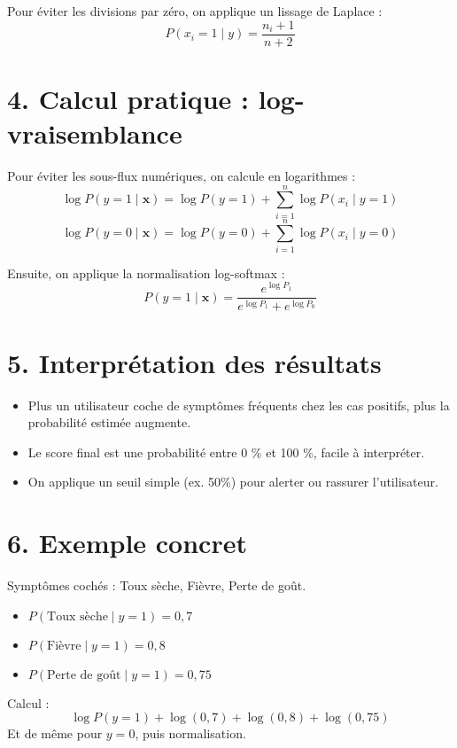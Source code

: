 \documentclass[12pt]{article}
\begin{document}
Pour éviter les divisions par zéro, on applique un lissage de Laplace :
\[
P(x_i = 1 \mid y) = \frac{n_i + 1}{n + 2}
\]

\section*{4. Calcul pratique : log-vraisemblance}

Pour éviter les sous-flux numériques, on calcule en logarithmes :
\[
\log P(y=1 \mid \mathbf{x}) = \log P(y=1) + \sum_{i=1}^n \log P(x_i \mid y=1)
\]
\[
\log P(y=0 \mid \mathbf{x}) = \log P(y=0) + \sum_{i=1}^n \log P(x_i \mid y=0)
\]

Ensuite, on applique la normalisation log-softmax :
\[
P(y=1 \mid \mathbf{x}) = \frac{e^{\log P_1}}{e^{\log P_1} + e^{\log P_0}}
\]

\section*{5. Interprétation des résultats}

\begin{itemize}
    \item Plus un utilisateur coche de symptômes fréquents chez les cas positifs, plus la probabilité estimée augmente.
    \item Le score final est une probabilité entre 0 \% et 100 \%, facile à interpréter.
    \item On applique un seuil simple (ex. 50\%) pour alerter ou rassurer l’utilisateur.
\end{itemize}

\section*{6. Exemple concret}

Symptômes cochés : Toux sèche, Fièvre, Perte de goût.

\begin{itemize}
    \item $P(\text{Toux sèche} \mid y=1) = 0{,}7$
    \item $P(\text{Fièvre} \mid y=1) = 0{,}8$
    \item $P(\text{Perte de goût} \mid y=1) = 0{,}75$
\end{itemize}

Calcul :
\[
\log P(y=1) + \log(0{,}7) + \log(0{,}8) + \log(0{,}75)
\]
Et de même pour $y=0$, puis normalisation.
\end{document}
